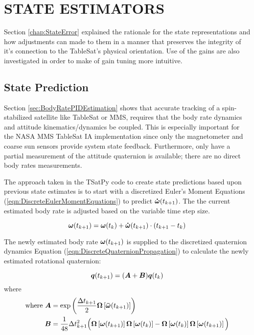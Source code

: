 
\chapter{STATE ESTIMATORS}
\label{chap:Estimators}

Section \ref{chap:StateError} explained the rationale for the state representations and how adjustments can made to them in a manner that preserves the integrity of it's connection to the TableSat's physical orientation.  Use of the gains are also investigated in order to make of gain tuning more intuitive.

\section{State Prediction}
\label{sec:StatePrediction}

Section \ref{sec:BodyRatePIDEstimation} shows that accurate tracking of a spin-stabilized satellite like TableSat or MMS, requires that the body rate dynamics and attitude kinematics/dynamics be coupled.  This is especially important for the NASA MMS TableSat IA implementation since only the magnetometer and coarse sun sensors provide system state feedback.  Furthermore, only have a partial measurement of the attitude quaternion is available; there are no direct body rates measurements.

The approach taken in the TSatPy code to create state predictions based upon previous state estimates is to start with a discretized Euler's Moment Equations (\ref{eqn:DiscreteEulerMomentEquations}) to predict $\boldsymbol{\dot{\omega}}(t_{k+1})$.  The the current estimated body rate is adjusted based on the variable time step size.

\begin{equation}
  \boldsymbol{\omega}(t_{k+1}) = \boldsymbol{\omega}(t_{k}) + \boldsymbol{\dot{\omega}}(t_{k+1})\cdot (t_{k+1} - t_k)
\end{equation}

The newly estimated body rate $\boldsymbol{\omega}(t_{k+1})$ is supplied to the discretized quaternion dynamics Equation (\ref{eqn:DiscreteQuaternionPropagation}) to calculate the newly estimated rotational quaternion:

\begin{equation}
  \boldsymbol{q}(t_{k+1}) = ( \boldsymbol{A} + \boldsymbol{B} ) \boldsymbol{q}(t_{k}) \\
\end{equation}
where
\begin{equation}
  \begin{aligned}
    \text{where } \boldsymbol{A} &= \exp \left( \frac{\Delta t_{k+1}}{2} \boldsymbol{\Omega} \left[ \boldsymbol{\bar{\omega}}(t_{k+1}) \right] \right)\\
    \boldsymbol{B} &= \frac{1}{48} \Delta t_{k+1}^2 \Big(
    \boldsymbol{\Omega} \left[\boldsymbol{\omega}(t_{k+1}) \right]
    \boldsymbol{\Omega} \left[\boldsymbol{\omega}(t_{k})   \right] -
    \boldsymbol{\Omega} \left[\boldsymbol{\omega}(t_{k})   \right]
    \boldsymbol{\Omega} \left[\boldsymbol{\omega}(t_{k+1}) \right]
      \Big)
  \end{aligned}
\end{equation}



